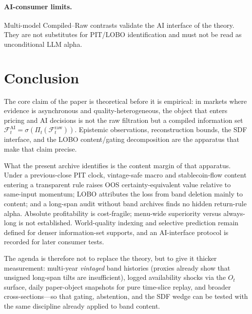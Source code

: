 \documentclass[12pt]{article}
\begin{document}
\paragraph{AI-consumer limits.}
Multi-model Compiled--Raw contrasts validate the AI interface of the theory. They are not substitutes for PIT/LOBO identification and must not be read as unconditional LLM alpha.

\section{Conclusion}
\label{sec:conc}

The core claim of the paper is theoretical before it is empirical: in markets where evidence is asynchronous and quality-heterogeneous, the object that enters pricing and AI decisions is not the raw filtration but a compiled information set $\mathcal{F}^{\mathrm{AI}}_t=\sigma(\Pi_t(\mathcal{F}^{\mathrm{raw}}_t))$. Epistemic observations, reconstruction bounds, the SDF interface, and the LOBO content/gating decomposition are the apparatus that make that claim precise.

What the present archive identifies is the content margin of that apparatus. Under a previous-close PIT clock, vintage-safe macro and stablecoin-flow content entering a transparent rule raises OOS certainty-equivalent value relative to same-input momentum; LOBO attributes the loss from band deletion mainly to content; and a long-span audit without band archives finds no hidden return-rule alpha. Absolute profitability is cost-fragile; menu-wide superiority versus always-long is not established. World-quality indexing and selective prediction remain defined for denser information-set supports, and an AI-interface protocol is recorded for later consumer tests.

The agenda is therefore not to replace the theory, but to give it thicker measurement: multi-year \emph{vintaged} band histories (proxies already show that unsigned long-span tilts are insufficient), logged availability shocks via the $O_t$ surface, daily paper-object snapshots for pure time-slice replay, and broader cross-sections---so that gating, abstention, and the SDF wedge can be tested with the same discipline already applied to band content.

\appendix
\end{document}
